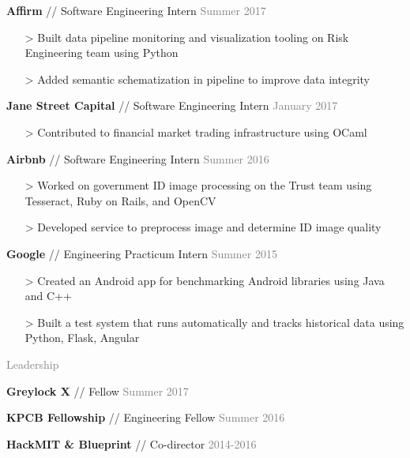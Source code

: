 \documentclass[11pt]{article}
\newcommand{\rsection}[1]{\vspace{1.5em}\textcolor{gray}{\Large \robotoslab #1}\vspace{0.5em}}
\newcommand{\bt}[1]{\textbf{#1}} %
\newcommand{\gap}[0]{\vspace{0.3em}} %
\newcommand{\sep}[0]{ // } %
\newcommand{\gray}[1]{\textcolor{gray}{#1}}
\newcommand{\e}[0]{> }
\begin{document}
\bt{Affirm}\sep Software Engineering Intern \hfill \gray{Summer 2017}

\begin{itemize}
\item[\e] Built data pipeline monitoring and visualization tooling on Risk Engineering team using Python
\item[\e] Added semantic schematization in pipeline to improve data integrity
\end{itemize}

\gap

\bt{Jane Street Capital}\sep Software Engineering Intern \hfill \gray{January 2017}

\begin{itemize}
\item[\e] Contributed to financial market trading infrastructure using OCaml
\end{itemize}

\gap

\bt{Airbnb}\sep Software Engineering Intern \hfill \gray{Summer 2016}

\begin{itemize}
\item[\e] Worked on government ID image processing on the Trust team using Tesseract, Ruby on Rails, and OpenCV
\item[\e] Developed service to preprocess image and determine ID image quality
\end{itemize}

\gap

\bt{Google}\sep Engineering Practicum Intern \hfill \gray{Summer 2015}

\begin{itemize}
\item[\e] Created an Android app for benchmarking Android libraries using Java and C++
\item[\e] Built a test system that runs automatically and tracks historical data using Python, Flask, Angular
\end{itemize}


\rsection{Leadership}

\bt{Greylock X}\sep Fellow \hfill \gray{Summer 2017}

\gap

\bt{KPCB Fellowship}\sep Engineering Fellow \hfill \gray{Summer 2016}

\gap

\bt{HackMIT \& Blueprint}\sep Co-director \hfill \gray{2014-2016}

\gap
\end{document}
